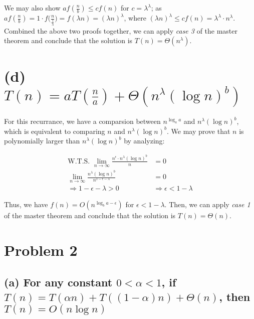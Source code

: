 \documentclass[11pt]{article}
\begin{document}
We may also show $af(\frac{n}{b}) \leq cf(n)$ for $c = \lambda^\lambda$; as $af(\frac{n}{b})  = 1 \cdot f\Big(\frac{n}{\frac{1}{\lambda}}\Big) = f(\lambda n) = (\lambda n)^{\lambda}$, where $(\lambda n)^{\lambda} \leq cf(n) =  \lambda^\lambda \cdot n^{\lambda}$. Combined the above two proofs together, we can apply \textit{case 3} of the master theorem and conclude that the solution is $T(n) = \Theta(n^\lambda)$.

\section{(d) $T(n) = aT(\frac{n}{a}) + \Theta(n^{\lambda}(\log n)^b)$}
For this recurrance, we have a comparsion between $n^{\log_a a}$ and $n^{\lambda}(\log n)^b$, which is equivalent to comparing $n$ and $n^{\lambda}(\log n)^b$. We may prove that $n$ is polynomially larger than $n^{\lambda}(\log n)^b$ by analyzing:

\begin{align}
    \text{W.T.S. \ }\lim_{n \to \infty} \frac{n^\epsilon \cdot n^\lambda (\log n)^b}{n} &= 0\\
    \lim_{n \to \infty} \frac{n^\lambda (\log n)^b}{n^{1-\epsilon - \lambda}} &= 0 \nonumber\\
    \Longrightarrow 1-\epsilon - \lambda > 0 &\Rightarrow \epsilon < 1 - \lambda
\end{align}

Thus, we have $f(n) = O(n^{\log_b a - \epsilon})$ for $\epsilon < 1 - \lambda$. Then, we can apply \textit{case 1} of the master theorem and conclude that the solution is $T(n) = \Theta(n)$.




\section{Problem 2}


\subsection{(a) For any constant $0 < \alpha < 1$, if $T(n) = T(\alpha n) + T((1-\alpha)n) + \Theta(n)$, then $T(n) = O(n \log n)$}
\end{document}
